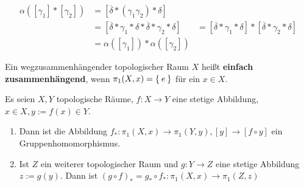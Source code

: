 \begin{beweis}
    \begin{align*}
        \alpha([\gamma_1] * [\gamma_2]) &= [\overline{\delta} * (\gamma_1 \gamma_2) * \delta]\\
        &= [\overline{\delta} * \gamma_1 * \delta * \overline{\delta} * \gamma_2 * \delta]
        &= [\overline{\delta} * \gamma_1 * \delta] * [\overline{\delta} * \gamma_2 * \delta]\\
        &= \alpha([\gamma_1]) * \alpha([\gamma_2])
    \end{align*}
\end{beweis}

\begin{definition}%
    Ein wegzusammenhängender topologischer Raum $X$ heißt
    \textbf{einfach zusammenhängend}, wenn $\pi_1(X,x) = \Set{e}$
    für ein  $x \in X$.
\end{definition}

\begin{korollar}\label{korr:11.5}
    Es seien $X, Y$ topologische Räume, $f:X \rightarrow Y$ eine
    stetige Abbildung, $x \in X, y := f(x) \in Y$.

    \begin{enumerate}[label=\alph*)]
        \item Dann ist die Abbildung $f_* : \pi_1(X,x) \rightarrow \pi_1(Y, y),
        [y] \rightarrow [f \circ y]$ ein Gruppenhomomorphismus.
        \item Ist $Z$ ein weiterer topologischer Raum und $g: Y \rightarrow Z$
              eine stetige Abbildung $z:= g(y)$. Dann ist
              $(g \circ f)_* = g_* \circ f_*: \pi_1(X,x) \rightarrow \pi_1(Z,z)$
    \end{enumerate}
\end{korollar}

